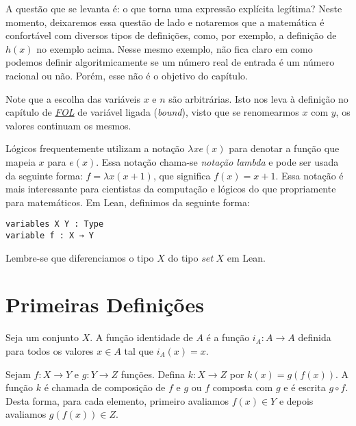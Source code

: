 A questão que se levanta é: o que torna uma expressão explícita legítima?
Neste momento, deixaremos essa questão de lado e notaremos que a matemática
é confortável com diversos tipos de definições, como, por exemplo, a definição
de $h(x)$ no exemplo acima. Nesse mesmo exemplo, não fica claro em como podemos
definir algoritmicamente se um número real de entrada é um número racional ou não.
Porém, esse não é o objetivo do capítulo.

Note que a escolha das variáveis $x$ e $n$ são arbitrárias.
Isto nos leva à definição no capítulo de \textit{\hyperlink{chapter.4}{FOL}} de
variável ligada (\textit{bound}), visto que se renomearmos $x$ com $y$, os valores
continuam os mesmos.

Lógicos frequentemente utilizam a notação $\lambda x e(x)$ para denotar a função
que mapeia $x$ para $e(x)$. Essa notação chama-se \textit{notação lambda} e pode
ser usada da seguinte forma: $f = \lambda x(x + 1)$, que significa $f(x) = x + 1$.
Essa notação é mais interessante para cientistas da computação e lógicos do que
propriamente para matemáticos. Em Lean, definimos da seguinte forma:

\begin{lstlisting}
variables X Y : Type
variable f : X → Y
\end{lstlisting}

Lembre-se que diferenciamos o tipo $X$ do tipo $set~X$ em Lean.

\section{Primeiras Definições}

\theoremstyle{definition}

\theoremstyle{definition}
\newtheorem{example}{Exemplo}[section]

\theoremstyle{plain}

\theoremstyle{plain}
\newtheorem{corollary}{Corolário}[section]

\begin{definition}
    \label{def1}
    Seja um conjunto $X$. A função identidade de $A$ é a função
    $i_A : A \rightarrow A$ definida para todos os valores $x \in A$ tal que $i_A(x) = x$.
\end{definition}

\begin{definition}
    \label{def2}
    Sejam $f : X \rightarrow Y$ e $g : Y \rightarrow Z$ funções.
    Defina $k : X \rightarrow Z$ por $k(x) = g(f(x))$. A função $k$ é chamada de composição
    de $f$ e $g$ ou $f$ composta com $g$ e é escrita $g \circ f$. Desta forma, para cada elemento,
    primeiro  avaliamos $f(x) \in Y$ e depois avaliamos $g(f(x)) \in Z$.
\end{definition}

